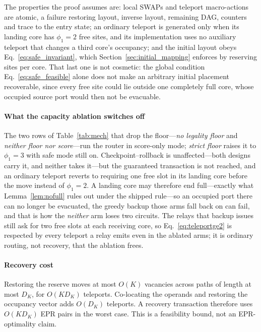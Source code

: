 The properties the proof assumes are: local SWAPs and teleport
macro-actions are atomic, a failure restoring layout, inverse layout, remaining
DAG, counters and trace to the entry state; an ordinary teleport is generated
only when its landing core has $\phi_1=2$ free sites, and its implementation
uses no auxiliary teleport that changes a third core's occupancy; and the
initial layout obeys Eq.~\eqref{eq:safe_invariant}, which
Section~\ref{sec:initial_mapping} enforces by reserving sites per core.  That
last one is not cosmetic: the global condition Eq.~\eqref{eq:safe_feasible}
alone does not make an arbitrary initial placement recoverable, since every
free site could lie outside one completely full core, whose occupied source
port would then not be evacuable.

\paragraph*{What the capacity ablation switches off}
The two rows of Table~\ref{tab:mech} that drop the floor---\emph{no legality
floor} and \emph{neither floor nor score}---run the router in score-only mode;
\emph{strict floor} raises it to $\phi_1=3$ with safe mode still on.
Checkpoint--rollback is unaffected---both designs carry it, and neither takes
it---but the guaranteed transaction is not reached, and an ordinary teleport
reverts to requiring one free slot in its landing core before the move instead
of $\phi_1=2$.  A landing core may therefore end full---exactly what
Lemma~\ref{lem:nofull} rules out under the shipped rule---so an occupied port
there can no longer be evacuated, the greedy backup those arms fall back on can
fail, and that is how the \emph{neither} arm loses two circuits.  The relays that
backup issues still ask for two free slots at each receiving core, so
Eq.~\eqref{eq:teleportge2} is respected by every teleport a relay emits even
in the ablated arms; it is ordinary routing, not recovery, that the ablation
frees.

\paragraph*{Recovery cost}
Restoring the reserve moves at most $O(K)$ vacancies across paths of length at
most $D_K$, for $O(KD_K)$ teleports.  Co-locating the operands and restoring
the occupancy vector adds $O(D_K)$ teleports.  A recovery transaction therefore
uses $O(KD_K)$ EPR pairs in the worst case.  This is a feasibility bound, not
an EPR-optimality claim.

